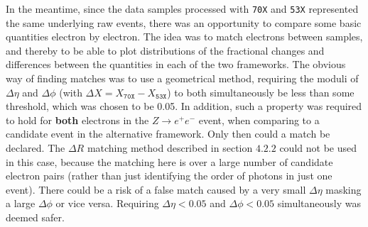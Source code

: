 \documentclass[10pt]{article}
\begin{document}
In the meantime, since the data samples processed with \texttt{70X} and \texttt{53X} represented the same underlying raw events, there was an opportunity to compare some basic quantities electron by electron. The idea was to match electrons between samples, and thereby to be able to plot distributions of the fractional changes and differences between the quantities in each of the two frameworks. The obvious way of finding matches was to use a geometrical method, requiring the moduli of $\Delta \eta$ and $\Delta \phi$  (with $\Delta X = X_\texttt{70X} -X_\texttt{53X}$) to both simultaneously be less than some threshold, which was chosen to be 0.05. In addition, such a property was required to hold for \textbf{both} electrons in the $Z\rightarrow e^+ e^-$ event, when comparing to a candidate event in the alternative framework. Only then could a match be declared. The $\Delta R$ matching method described in section $4.2.2$ could not be used in this case, because the matching here is over a large number of candidate electron pairs (rather than just identifying the order of photons in just one event). There could be a risk of a false match caused by a very small $\Delta \eta$ masking a large $\Delta \phi$ or vice versa. Requiring $\Delta \eta <0.05$ and $\Delta \phi<0.05$ simultaneously was deemed safer.
\end{document}
